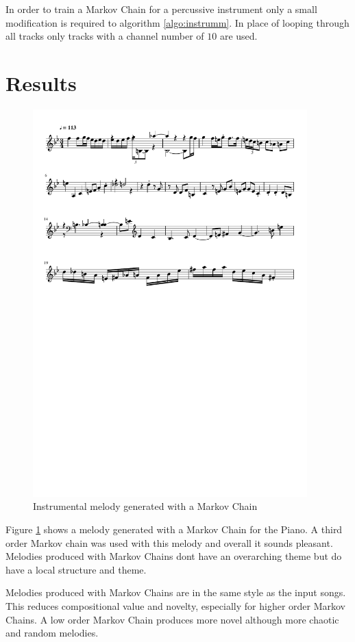 In order to train a Markov Chain for a percussive instrument only a small modification is required to algorithm \ref{algo:instrumm}. In place of looping through all tracks only tracks with a channel number of $10$ are used.

\section{Results}
\begin{figure}
\centerline{\includegraphics[width=400px]{../images/instrumental_acousticgrand.pdf}}
\caption{Instrumental melody generated with a Markov Chain}
\label{ims:instrumentalmc}
\end{figure}

Figure \ref{ims:instrumentalmc} shows a melody generated with a Markov Chain for the Piano. A third order Markov chain was used with this melody and overall it sounds pleasant. Melodies produced with Markov Chains dont have an overarching theme but do have a local structure and theme.

Melodies produced with Markov Chains are in the same style as the input songs. This reduces compositional value and novelty, especially for higher order Markov Chains. A low order Markov Chain produces more novel although more chaotic and random melodies. 

